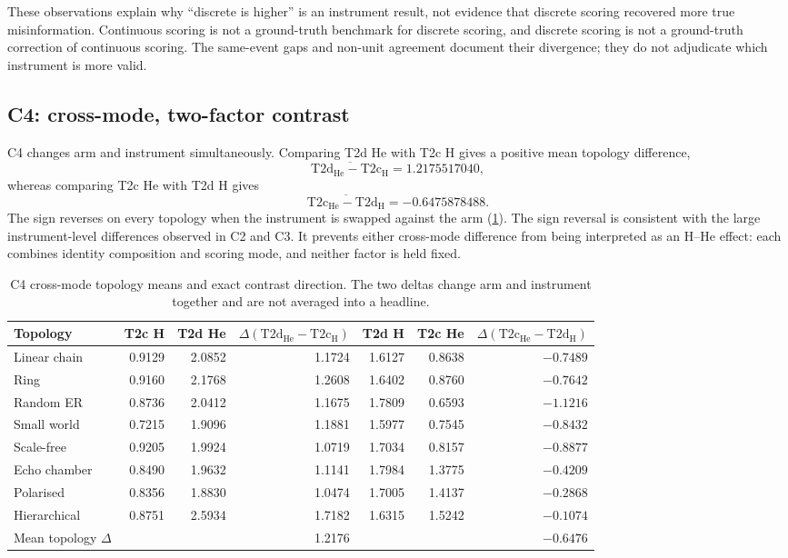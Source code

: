 These observations explain why ``discrete is higher'' is an instrument
result, not evidence that discrete scoring recovered more true
misinformation.  Continuous scoring is not a ground-truth benchmark for
discrete scoring, and discrete scoring is not a ground-truth correction of
continuous scoring.  The same-event gaps and non-unit agreement document
their divergence; they do not adjudicate which instrument is more valid.

\subsection{C4: cross-mode, two-factor contrast}
\label{subsec:c4-mpr}

C4 changes arm and instrument simultaneously.  Comparing T2d He with T2c H
gives a positive mean topology difference,
\[
  \overline{\mathrm{T2d_{He}}-\mathrm{T2c_H}}
  = 1.2175517040 ,
\]
whereas comparing T2c He with T2d H gives
\[
  \overline{\mathrm{T2c_{He}}-\mathrm{T2d_H}}
  = -0.6475878488 .
\]
The sign reverses on every topology when the instrument is swapped against
the arm (\cref{tab:c4-mpr}).  The sign reversal is consistent with the large
instrument-level differences observed in C2 and C3.  It prevents either cross-mode
difference from being interpreted as an H--He effect: each combines
identity composition and scoring mode, and neither factor is held fixed.

\begin{table}[t]
\centering
\caption{C4 cross-mode topology means and exact contrast direction.
The two deltas change arm and instrument together and are not averaged into
a headline.}
\label{tab:c4-mpr}
\small
\begin{tabular}{lrrrrrr}
\toprule
Topology
  & T2c H & T2d He & $\Delta(\mathrm{T2d_{He}}-\mathrm{T2c_H})$
  & T2d H & T2c He & $\Delta(\mathrm{T2c_{He}}-\mathrm{T2d_H})$ \\
\midrule
Linear chain & 0.9129 & 2.0852 & 1.1724 & 1.6127 & 0.8638 & $-0.7489$ \\
Ring         & 0.9160 & 2.1768 & 1.2608 & 1.6402 & 0.8760 & $-0.7642$ \\
Random ER    & 0.8736 & 2.0412 & 1.1675 & 1.7809 & 0.6593 & $-1.1216$ \\
Small world  & 0.7215 & 1.9096 & 1.1881 & 1.5977 & 0.7545 & $-0.8432$ \\
Scale-free   & 0.9205 & 1.9924 & 1.0719 & 1.7034 & 0.8157 & $-0.8877$ \\
Echo chamber & 0.8490 & 1.9632 & 1.1141 & 1.7984 & 1.3775 & $-0.4209$ \\
Polarised    & 0.8356 & 1.8830 & 1.0474 & 1.7005 & 1.4137 & $-0.2868$ \\
Hierarchical & 0.8751 & 2.5934 & 1.7182 & 1.6315 & 1.5242 & $-0.1074$ \\
\midrule
Mean topology $\Delta$
  & \multicolumn{2}{r}{} & 1.2176
  & \multicolumn{2}{r}{} & $-0.6476$ \\
\bottomrule
\end{tabular}
\end{table}

